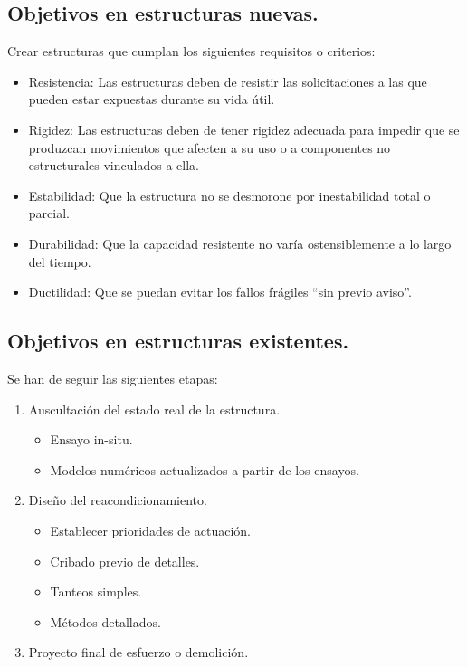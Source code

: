 \subsection{Objetivos en estructuras nuevas.}
Crear estructuras que cumplan los siguientes requisitos o criterios:
\begin{itemize}
    \item Resistencia: Las estructuras deben de resistir las solicitaciones a las que pueden estar expuestas durante su vida útil.
    \item Rigidez: Las estructuras deben de tener rigidez adecuada para impedir que se produzcan movimientos que afecten a su uso o a componentes no estructurales vinculados a ella.
    \item Estabilidad: Que la estructura no se desmorone por inestabilidad total o parcial.
    \item Durabilidad: Que la capacidad resistente no varía ostensiblemente a lo largo del tiempo.
    \item Ductilidad: Que se puedan evitar los fallos frágiles ``sin previo aviso''.
\end{itemize}

\subsection{Objetivos en estructuras existentes.}
Se han de seguir las siguientes etapas:
\begin{enumerate}
    \item Auscultación del estado real de la estructura.
    \begin{itemize}
        \item Ensayo in-situ.
        \item Modelos numéricos actualizados a partir de los ensayos.
    \end{itemize}
    \item Diseño del reacondicionamiento.
    \begin{itemize}
        \item Establecer prioridades de actuación.
        \item Cribado previo de detalles.
        \item Tanteos simples.
        \item Métodos detallados.
    \end{itemize}
    \item Proyecto final de esfuerzo o demolición.
\end{enumerate}

